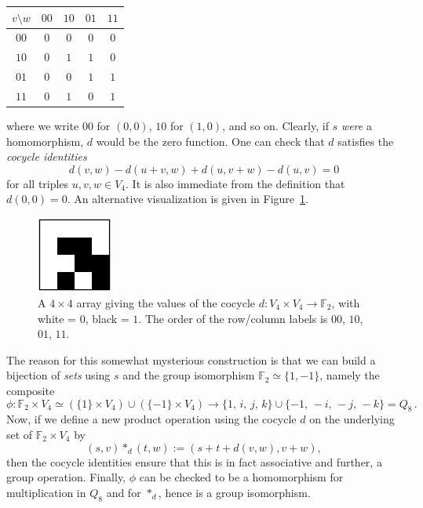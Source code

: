 \documentclass{article}
\theoremstyle{plain}
\theoremstyle{definition}
\def \FF {\mathbb{F}}
\begin{document}
\begin{center}
\begin{tabular*}{0.35\textwidth}{c|cccc}
$v\setminus w$&$00$&$10$&$01$&$11$\\
\hline
	$00$		& $0$& $0$& $0$& $0$\\
	$10$		& $0$& $1$& $1$& $0$\\
	$01$		& $0$& $0$& $1$& $1$\\
	$11$		& $0$& $1$& $0$& $1$\\
\end{tabular*}
\end{center}
where we write $00$ for $(0,0)$, $10$ for $(1,0)$, and so on.
Clearly, if $s$ \emph{were} a homomorphism, $d$ would be the zero function.
One can check that $d$ satisfies the \emph{cocycle identities}
\begin{equation}\label{eq:cocycle_eqn}
	d(v,w)-d(u+v,w)+d(u,v+w)-d(u,v) = 0
\end{equation}
for all triples $u,v,w\in V_4$. 
It is also immediate from the definition that $d(0,0)=0$.
An alternative visualization is given in Figure~\ref{fig:cocycle for q8}.

\begin{figure}[!ht]
\begin{center}
\includegraphics[height=2.5cm]{quaternion_cocyc}
\end{center}
\caption{A $4\times4$ array giving the values of the cocycle $d\colon V_4\times V_4\to \FF_2$, with white = $0$, black = $1$. The order of the row/column labels is $00$, $10$, $01$, $11$.}
\label{fig:cocycle for q8}
\end{figure}


The reason for this somewhat mysterious construction is that we can build a bijection of \emph{sets} using $s$ and the group isomorphism $\FF_2\simeq \{1,-1\}$, namely the composite
\[
	\phi\colon \FF_2\times V_4 \simeq \left(\{1\}\times V_4\right) \cup \left(\{-1\} \times V_4\right)\! \to\!
	\{1,\, i,\, j,\, k\}\cup \{-1,\, -i,\, -j,\, -k\} = Q_8\,.
\]
Now, if we define a new product operation using the cocycle $d$ on the underlying set of $\FF_2\times V_4$ by
\[
	(s,v)\ast_d(t,w):=(s+ t+ d(v,w),v+w),
\]
then the cocycle identities ensure that this is in fact associative and further, a group operation.
Finally, $\phi$ can be checked to be a homomorphism for multiplication in $Q_8$ and for $\ast_d$, hence is a group isomorphism.
\end{document}
